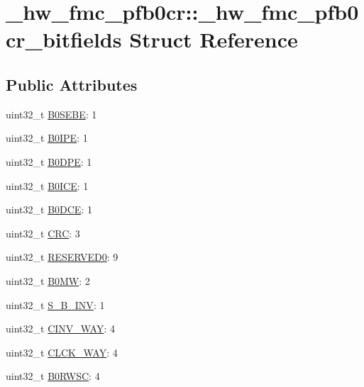 \hypertarget{struct__hw__fmc__pfb0cr_1_1__hw__fmc__pfb0cr__bitfields}{}\section{\+\_\+hw\+\_\+fmc\+\_\+pfb0cr\+:\+:\+\_\+hw\+\_\+fmc\+\_\+pfb0cr\+\_\+bitfields Struct Reference}
\label{struct__hw__fmc__pfb0cr_1_1__hw__fmc__pfb0cr__bitfields}
\subsection*{Public Attributes}
\begin{DoxyCompactItemize}
\item 
uint32\+\_\+t \hyperlink{struct__hw__fmc__pfb0cr_1_1__hw__fmc__pfb0cr__bitfields_a8417d31ae0f3ac42e553ca9a6c866a12}{B0\+S\+E\+BE}\+: 1
\item 
uint32\+\_\+t \hyperlink{struct__hw__fmc__pfb0cr_1_1__hw__fmc__pfb0cr__bitfields_af004c47a6559461e570c703a8cd0d9f3}{B0\+I\+PE}\+: 1
\item 
uint32\+\_\+t \hyperlink{struct__hw__fmc__pfb0cr_1_1__hw__fmc__pfb0cr__bitfields_a974bb05d390384264a6eeb417c9b13d9}{B0\+D\+PE}\+: 1
\item 
uint32\+\_\+t \hyperlink{struct__hw__fmc__pfb0cr_1_1__hw__fmc__pfb0cr__bitfields_a51efecfd2b0cfab2ca68adbde6fe279c}{B0\+I\+CE}\+: 1
\item 
uint32\+\_\+t \hyperlink{struct__hw__fmc__pfb0cr_1_1__hw__fmc__pfb0cr__bitfields_a73bde3972b3100ce42fc24a509714172}{B0\+D\+CE}\+: 1
\item 
uint32\+\_\+t \hyperlink{struct__hw__fmc__pfb0cr_1_1__hw__fmc__pfb0cr__bitfields_a039c96970cf103064ec26bcf948f0c2a}{C\+RC}\+: 3
\item 
uint32\+\_\+t \hyperlink{struct__hw__fmc__pfb0cr_1_1__hw__fmc__pfb0cr__bitfields_a746a67b2401afdd1e1b384016ed3fc72}{R\+E\+S\+E\+R\+V\+E\+D0}\+: 9
\item 
uint32\+\_\+t \hyperlink{struct__hw__fmc__pfb0cr_1_1__hw__fmc__pfb0cr__bitfields_af139473b0f0f869109406f8770b95dbf}{B0\+MW}\+: 2
\item 
uint32\+\_\+t \hyperlink{struct__hw__fmc__pfb0cr_1_1__hw__fmc__pfb0cr__bitfields_aa49e1d1a0f37e271368be0a40de17d0e}{S\+\_\+\+B\+\_\+\+I\+NV}\+: 1
\item 
uint32\+\_\+t \hyperlink{struct__hw__fmc__pfb0cr_1_1__hw__fmc__pfb0cr__bitfields_a02ba06bc11cc58d7ce46e85f0183aa71}{C\+I\+N\+V\+\_\+\+W\+AY}\+: 4
\item 
uint32\+\_\+t \hyperlink{struct__hw__fmc__pfb0cr_1_1__hw__fmc__pfb0cr__bitfields_a1a252f92d95f217137b1cc64923f7811}{C\+L\+C\+K\+\_\+\+W\+AY}\+: 4
\item 
uint32\+\_\+t \hyperlink{struct__hw__fmc__pfb0cr_1_1__hw__fmc__pfb0cr__bitfields_a8ea991b190bc03f2c140bd5e340025d1}{B0\+R\+W\+SC}\+: 4
\end{DoxyCompactItemize}


